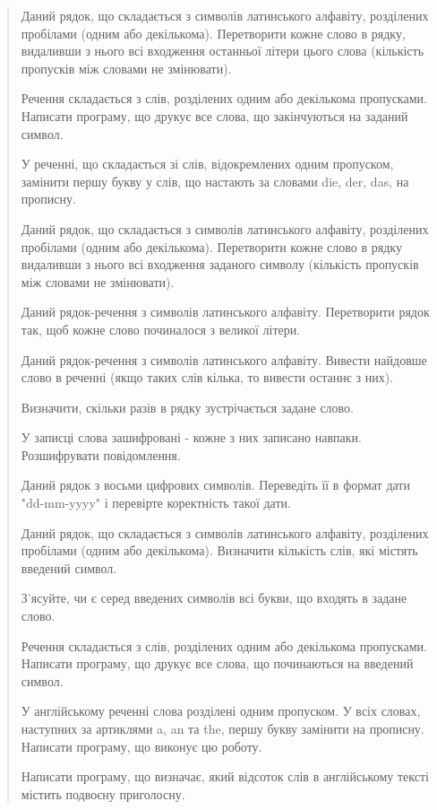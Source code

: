 \documentclass[]{article}
\begin{document}
\begin{quote}
Даний рядок, що складається з символів латинського алфавіту, розділених
пробілами (одним або декількома). Перетворити кожне слово в рядку,
видаливши з нього всі входження останньої літери цього слова (кількість
пропусків між словами не змінювати).

Речення складається з слів, розділених одним або декількома пропусками.
Написати програму, що друкує все слова, що закінчуються на заданий
символ.

\protect\hypertarget{_Hlk65949239}{}{}У реченні, що складається зі слів,
відокремлених одним пропуском, замінити першу букву у слів, що настають
за словами die, der, das, на прописну.

\protect\hypertarget{_Hlk65949422}{}{}Даний рядок, що складається з
символів латинського алфавіту, розділених пробілами (одним або
декількома). Перетворити кожне слово в рядку видаливши з нього всі
входження заданого символу (кількість пропусків між словами не
змінювати).

Даний рядок-речення з символів латинського алфавіту. Перетворити рядок
так, щоб кожне слово починалося з великої літери.

Даний рядок-речення з символів латинського алфавіту. Вивести найдовше
слово в реченні (якщо таких слів кілька, то вивести останнє з них).

Визначити, скільки разів в рядку зустрічається задане слово.

\protect\hypertarget{_Hlk65949361}{}{}У записці слова зашифровані -
кожне з них записано навпаки. Розшифрувати повідомлення.

Даний рядок з восьми цифрових символів. Переведіть її в формат дати
"dd-mm-yyyy" і перевірте коректність такої дати.

Даний рядок, що складається з символів латинського алфавіту, розділених
пробілами (одним або декількома). Визначити кількість слів, які містять
введений символ.

З'ясуйте, чи є серед введених символів всі букви, що входять в задане
слово.

Речення складається з слів, розділених одним або декількома пропусками.
Написати програму, що друкує все слова, що починаються на введений
символ.

У англійському реченні слова розділені одним пропуском. У всіх словах,
наступних за артиклями a, an та the, першу букву замінити на прописну.
Написати програму, що виконує цю роботу.

Написати програму, що визначає, який відсоток слів в англійському тексті
містить подвоєну приголосну.


\end{quote}
\end{document}
